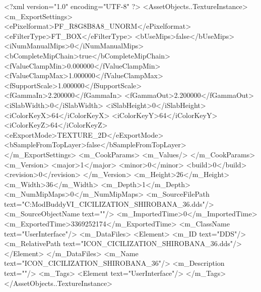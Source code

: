 <?xml version="1.0" encoding="UTF-8" ?>
<AssetObjects..TextureInstance>
	<m_ExportSettings>
		<ePixelformat>PF_R8G8B8A8_UNORM</ePixelformat>
		<eFilterType>FT_BOX</eFilterType>
		<bUseMips>false</bUseMips>
		<iNumManualMips>0</iNumManualMips>
		<bCompleteMipChain>true</bCompleteMipChain>
		<fValueClampMin>0.000000</fValueClampMin>
		<fValueClampMax>1.000000</fValueClampMax>
		<fSupportScale>1.000000</fSupportScale>
		<fGammaIn>2.200000</fGammaIn>
		<fGammaOut>2.200000</fGammaOut>
		<iSlabWidth>0</iSlabWidth>
		<iSlabHeight>0</iSlabHeight>
		<iColorKeyX>64</iColorKeyX>
		<iColorKeyY>64</iColorKeyY>
		<iColorKeyZ>64</iColorKeyZ>
		<eExportMode>TEXTURE_2D</eExportMode>
		<bSampleFromTopLayer>false</bSampleFromTopLayer>
	</m_ExportSettings>
	<m_CookParams>
		<m_Values/>
	</m_CookParams>
	<m_Version>
		<major>1</major>
		<minor>0</minor>
		<build>0</build>
		<revision>0</revision>
	</m_Version>
	<m_Height>26</m_Height>
	<m_Width>36</m_Width>
	<m_Depth>1</m_Depth>
	<m_NumMipMaps>0</m_NumMipMaps>
	<m_SourceFilePath text="C:\Users\asus\Documents\Firaxis ModBuddy\Civilization VI\temppic\ICON_CICILIZATION_SHIROBANA_36.dds"/>
	<m_SourceObjectName text=""/>
	<m_ImportedTime>0</m_ImportedTime>
	<m_ExportedTime>3369252174</m_ExportedTime>
	<m_ClassName text="UserInterface"/>
	<m_DataFiles>
		<Element>
			<m_ID text="DDS"/>
			<m_RelativePath text="ICON_CICILIZATION_SHIROBANA_36.dds"/>
		</Element>
	</m_DataFiles>
	<m_Name text="ICON_CICILIZATION_SHIROBANA_36"/>
	<m_Description text=""/>
	<m_Tags>
		<Element text="UserInterface"/>
	</m_Tags>
</AssetObjects..TextureInstance>

